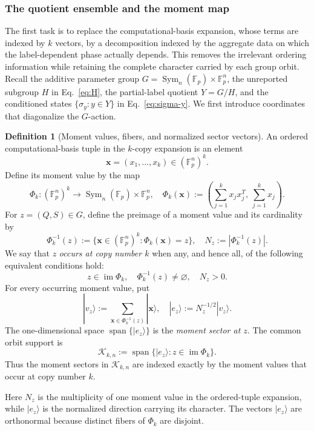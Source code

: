 \documentclass[11pt]{article}
\newcommand{\F}{\mathbb F}
\newcommand{\Sym}{\operatorname{Sym}}
\newcommand{\1}{\mathbf 1}
\theoremstyle{plain}
\theoremstyle{definition}
\newtheorem{definition}[theorem]{Definition}
\theoremstyle{remark}
\begin{document}
\subsubsection{The quotient ensemble and the moment map}
The first task is to replace the computational-basis expansion, whose terms are indexed by $k$ vectors, by a decomposition indexed by the aggregate data on which the label-dependent phase actually depends.  This removes the irrelevant ordering information while retaining the complete character carried by each group orbit.  Recall the additive parameter group $G=\Sym_n(\F_p)\times\F_p^n$, the unreported
subgroup $H$ in Eq.~\eqref{eq:H}, the partial-label quotient $Y=G/H$, and the
conditioned states $\{\sigma_y:y\in Y\}$ in Eq.~\eqref{eq:sigma-y}.  We first
introduce coordinates that diagonalize the $G$-action.

\begin{definition}[Moment values, fibers, and normalized sector vectors]
An ordered computational-basis tuple in the $k$-copy expansion is an element
\begin{equation}
 \boldsymbol x=(x_1,\ldots,x_k)\in(\F_p^n)^k.
 \label{eq:ordered-basis-tuple-domain}
\end{equation}
Define its moment value by the map
\begin{equation}
 \Phi_k:(\F_p^n)^k\longrightarrow
 \Sym_n(\F_p)\times\F_p^n,
 \quad
 \Phi_k(\boldsymbol x)
 :=\left(\sum_{j=1}^k x_jx_j^T,\ \sum_{j=1}^k x_j\right).
 \label{eq:moment-map}
\end{equation}
For $z=(Q,S)\in G$, define the preimage of a moment value and its cardinality by
\begin{equation}
 \Phi_k^{-1}(z)
 :=\{\boldsymbol x\in(\F_p^n)^k:\Phi_k(\boldsymbol x)=z\},
 \quad
 N_z:=|\Phi_k^{-1}(z)|.
 \label{eq:moment-fiber-and-cardinality}
\end{equation}
We say that $z$ \emph{occurs at copy number $k$} when any, and hence all, of
the following equivalent conditions hold:
\begin{equation}
 z\in\operatorname{im}\Phi_k,
 \quad
 \Phi_k^{-1}(z)\ne\varnothing,
 \quad
 N_z>0.
 \label{eq:occurring-moment-equivalences}
\end{equation}
For every occurring moment value, put
\begin{equation}
 |v_z\rangle
 :=\sum_{\boldsymbol x\in\Phi_k^{-1}(z)}|\boldsymbol x\rangle,
 \quad
 |e_z\rangle:=N_z^{-1/2}|v_z\rangle.
 \label{eq:fiber-sector}
\end{equation}
The one-dimensional space $\operatorname{span}\{|e_z\rangle\}$ is the
\emph{moment sector at $z$}.  The common orbit support is
\begin{equation}
 \mathcal K_{k,n}
 :=\operatorname{span}\{|e_z\rangle:z\in\operatorname{im}\Phi_k\}.
 \label{eq:orbit-support}
\end{equation}
Thus the moment sectors in $\mathcal K_{k,n}$ are indexed exactly by the
moment values that occur at copy number $k$.
\end{definition}
Here $N_z$ is the multiplicity of one moment value in the ordered-tuple
expansion, while $|e_z\rangle$ is the normalized direction carrying its
character.  The vectors $|e_z\rangle$ are orthonormal because distinct fibers
of $\Phi_k$ are disjoint.
\end{document}
